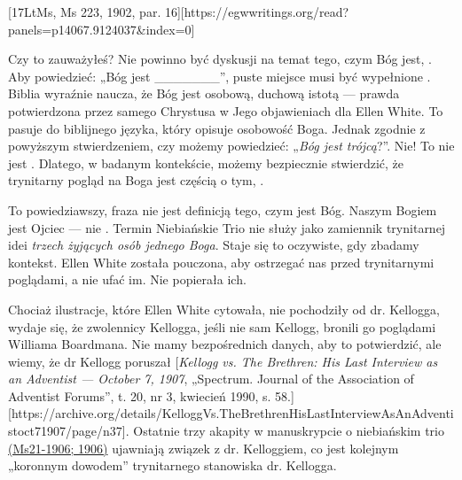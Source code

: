 [17LtMs, Ms 223, 1902, par. 16][https://egwwritings.org/read?panels=p14067.9124037&index=0]

Czy to zauważyłeś? Nie powinno być dyskusji na temat tego, czym Bóg jest, . Aby powiedzieć: „Bóg jest \_\_\_\_\_\_\_”, puste miejsce musi być wypełnione . Biblia wyraźnie naucza, że Bóg jest osobową, duchową istotą — prawda potwierdzona przez samego Chrystusa w Jego objawieniach dla Ellen White. To pasuje do biblijnego języka, który opisuje osobowość Boga. Jednak zgodnie z powyższym stwierdzeniem, czy możemy powiedzieć: „\textit{Bóg jest trójcą}?”. Nie! To nie jest . Dlatego, w badanym kontekście, możemy bezpiecznie stwierdzić, że trynitarny pogląd na Boga jest częścią  o tym, .

To powiedziawszy, fraza  nie jest definicją tego, czym jest Bóg. Naszym Bogiem jest Ojciec — nie . Termin Niebiańskie Trio nie służy jako zamiennik trynitarnej idei \textit{trzech żyjących osób jednego Boga}. Staje się to oczywiste, gdy zbadamy kontekst. Ellen White została pouczona, aby ostrzegać nas przed trynitarnymi poglądami, a nie ufać im. Nie popierała ich.

Chociaż ilustracje, które Ellen White cytowała, nie pochodziły od dr. Kellogga, wydaje się, że zwolennicy Kellogga, jeśli nie sam Kellogg, bronili go poglądami Williama Boardmana. Nie mamy bezpośrednich danych, aby to potwierdzić, ale wiemy, że dr Kellogg poruszał [\textit{Kellogg vs. The Brethren: His Last Interview as an Adventist — October 7, 1907}, „Spectrum. Journal of the Association of Adventist Forums”, t. 20, nr 3, kwiecień 1990, s. 58.][https://archive.org/details/KelloggVs.TheBrethrenHisLastInterviewAsAnAdventistoct71907/page/n37]. Ostatnie trzy akapity w manuskrypcie o niebiańskim trio \href{https://egwwritings.org/?ref=en_Ms21-1906&para=9754.1}{(Ms21-1906; 1906)} ujawniają związek z dr. Kelloggiem, co jest kolejnym „koronnym dowodem” trynitarnego stanowiska dr. Kellogga.

